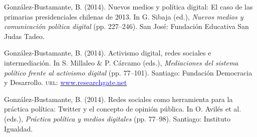 \begin{publications}
\begin{benumerate}{12}
\item{González-Bustamante, B. (2014). Nuevos medios y política digital: El caso de las primarias presidenciales chilenas de 2013. In G. Sibaja (ed.), {\itshape Nuevos  medios y comunicación política digital} (pp. 227--246). San José: Fundación Educativa San Judas Tadeo.}\vspace{1mm}


\item{González-Bustamante, B. (2014). Activismo digital, redes sociales e intermediación. In S. Millaleo \& P. C\'arcamo (eds.), {\itshape Mediaciones del  sistema político frente al activismo digital} (pp. 77--101). Santiago: Fundación Democracia y Desarrollo. {\scshape url:} \href{https://www.researchgate.net/publication/321992867_Activismo_digital_redes_sociales_e_intermediacion}{\textcolor{blue}{www.researchgate.net}}}\vspace{1mm}


\item{González-Bustamante, B. (2014). Redes sociales como herramienta para la práctica política: Twitter y el concepto de opinión pública. In O. Avilés et al. (eds.), {\itshape Práctica política y medios digitales} (pp. 77--98). Santiago: Instituto Igualdad.}\vspace{1mm}



\end{benumerate}
\end{publications}
